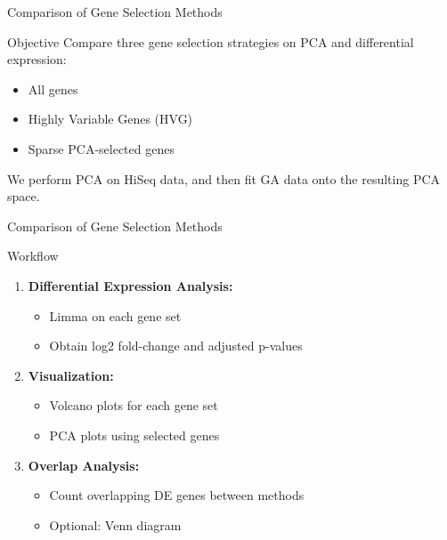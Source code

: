 \documentclass[12pt, aspectratio=43]{beamer}
\begin{document}
		
	\begin{frame}{Comparison of Gene Selection Methods}
		
		\begin{block}{Objective}
			Compare three gene selection strategies on PCA and differential expression:
			\begin{itemize}
				\item All genes
				\item Highly Variable Genes (HVG)
				\item Sparse PCA-selected genes
			\end{itemize}
			We perform PCA on HiSeq data, and then fit GA data onto the resulting PCA space.
		\end{block}
		
		\end{frame}
		
		\begin{frame}{Comparison of Gene Selection Methods}
		
		\begin{block}{Workflow}
			\begin{enumerate}
				\item \textbf{Differential Expression Analysis:} 
				\begin{itemize}
					\item Limma on each gene set
					\item Obtain log2 fold-change and adjusted p-values
				\end{itemize}
				
				\item \textbf{Visualization:}
				\begin{itemize}
					\item Volcano plots for each gene set
					\item PCA plots using selected genes
				\end{itemize}
				
				\item \textbf{Overlap Analysis:}
				\begin{itemize}
					\item Count overlapping DE genes between methods
					\item Optional: Venn diagram
				\end{itemize}
			\end{enumerate}
		\end{block}
		
	\end{frame}
	
\end{document}
